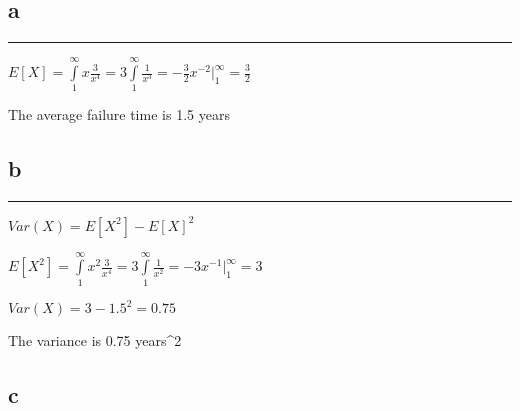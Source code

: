 \documentclass[]{tufte-handout}
\begin{document}
\hypertarget{a-9}{%
\subsection{a}\label{a-9}}

\begin{center}\rule{0.5\linewidth}{0.5pt}\end{center}

\(E[X] = \int \limits_1^\infty x\frac{3}{x^4} = 3\int \limits_1^\infty \frac{1}{x^3} = -\frac{3}{2}x^{-2}\Big|^\infty_1 = \frac{3}{2}\)

The average failure time is 1.5 years

\hypertarget{b-9}{%
\subsection{b}\label{b-9}}

\begin{center}\rule{0.5\linewidth}{0.5pt}\end{center}

\(Var(X) = E[X^2] - E[X]^2\)

\(E[X^2] = \int \limits_1^\infty x^2\frac{3}{x^4} = 3\int \limits_1^\infty \frac{1}{x^2} = -3x^{-1}\Big|^\infty_1 = 3\)

\(Var(X) = 3 - 1.5^2 = 0.75\)

The variance is 0.75 years\^{}2

\hypertarget{c-3}{%
\subsection{c}\label{c-3}}
\end{document}
